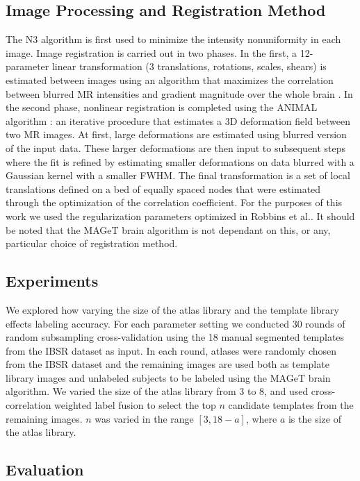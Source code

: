 \documentclass{article}\usepackage{graphicx, color}
\begin{document}
\subsection{Image Processing and Registration Method}
The N3 algorithm \cite{Sled1998} is first used to minimize the intensity
nonuniformity in each image.  Image registration is carried out in two phases.
In the first, a 12-parameter linear transformation (3 translations, rotations,
scales, shears) is estimated between images using an algorithm that maximizes
the correlation between blurred MR intensities and gradient magnitude over the
whole brain \cite{Collins}.  In the second phase, nonlinear registration is
completed using the ANIMAL algorithm \cite{Collins1995}: an iterative procedure
that estimates a 3D deformation field between two MR images. At first, large
deformations are estimated using blurred version of the input data. These
larger deformations are then input to subsequent steps where the fit is refined
by estimating smaller deformations on data blurred with a Gaussian kernel with
a smaller FWHM. The final transformation is a set of local translations defined
on a bed of equally spaced nodes that were estimated through the optimization
of the correlation coefficient. For the purposes of this work we used the
regularization parameters optimized in Robbins et al.\cite{Robbins2004}. It
should be noted that the MAGeT brain algorithm is not dependant on this, or
any, particular choice of registration method\cite{Chakravarty2012}.

\subsection{Experiments}

We explored how varying the size of the atlas library and the template library
effects labeling accuracy.  For each parameter setting we conducted 30 rounds
of random subsampling cross-validation using the 18 manual segmented templates
from the IBSR dataset as input. In each round, atlases were randomly chosen
from the IBSR dataset and the remaining images are used both as template
library images and unlabeled subjects to be labeled using the MAGeT brain
algorithm.  We varied the size of the atlas library from 3 to 8, and used
cross-correlation weighted label fusion to select the top $n$ candidate
templates from the remaining images.  $n$ was varied in the range $[3, 18-a]$,
where $a$ is the size of the atlas library.

\subsection{Evaluation}
\end{document}
